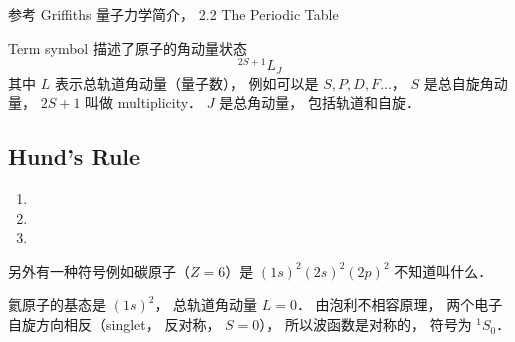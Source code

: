 

参考 Griffiths 量子力学简介， 2.2 The Periodic Table

Term symbol 描述了原子的角动量状态
\begin{equation}
^{2S + 1} L_J
\end{equation}
其中 $L$ 表示总轨道角动量（量子数）， 例如可以是 $S, P, D, F \dots$， $S$ 是总自旋角动量， $2S + 1$ 叫做 multiplicity． $J$ 是总角动量， 包括轨道和自旋．

\subsection{Hund's Rule}

\begin{enumerate}
\item 
\item 
\item 
\end{enumerate}

另外有一种符号例如碳原子（$Z = 6$）是 $(1s)^2 (2s)^2 (2p)^2$ 不知道叫什么．

氦原子的基态是 $(1s)^2$， 总轨道角动量 $L = 0$． 由泡利不相容原理， 两个电子自旋方向相反（singlet， 反对称， $S = 0$）， 所以波函数是对称的， 符号为 $^1 S_0$．
